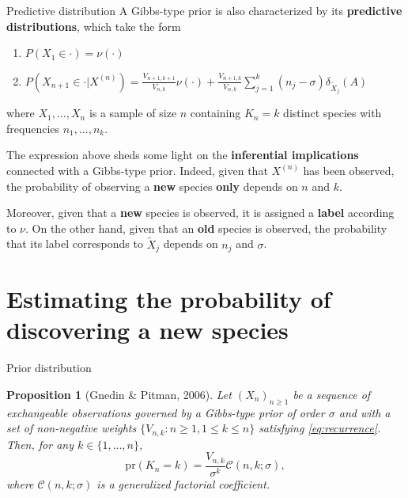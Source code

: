 \documentclass[11pt]{beamer}
\newtheorem{proposition}{Proposition}
\begin{document}
\begin{frame}{Predictive distribution}
    A Gibbs-type prior is also characterized by its \textbf{predictive distributions}, which take the form
    \begin{enumerate}
        \item \(P(X_1 \in \cdot) = \nu(\cdot)\)
        \item \(P(X_{n + 1} \in \cdot | X^{(n)}) = \frac{V_{n+1,k+1}}{V_{n,k}} \nu(\cdot) + \frac{V_{n+1,k}}{V_{n, k}} \sum_{j = 1}^k (n_j - \sigma) \delta_{\tilde{X}_j}(A)\)
    \end{enumerate}
    where \(X_1,...,X_n\) is a sample of size \(n\) containing \(K_n = k\) distinct species with frequencies \(n_1,...,n_k\).
    \medskip\pause

    The expression above sheds some light on the \textbf{inferential implications} connected with a Gibbs-type prior. Indeed, given that \(X^{(n)}\) has been observed, the probability of observing a \textbf{new} species \textbf{only} depends on \(n\) and \(k\). 
    \medskip
    
    Moreover, given that a \textbf{new} species is observed, it is assigned a \textbf{label} according to \(\nu\). On the other hand, given that an \textbf{old} species is observed, the probability that its label corresponds to \(\tilde{X}_j\) depends on \(n_j\) and \(\sigma\).
\end{frame}

\section{Estimating the probability of discovering a new species}

\begin{frame}{Prior distribution}
    \begin{proposition}[Gnedin \& Pitman, 2006]
         Let \((X_n)_{n \geq 1}\) be a sequence of exchangeable observations governed by a Gibbs-type prior of order \(\sigma\) and with a set of non-negative weights \(\{V_{n, k} \colon n \geq 1, 1 \leq k \leq n\}\) satisfying \eqref{eq:recurrence}. Then, for any \(k \in \{1,...,n\}\),
        \begin{equation*}
            \text{pr}(K_n = k) = \frac{V_{n,k}}{\sigma^k} \mathscr{C}(n, k; \sigma),
        \end{equation*}
        where \(\mathscr{C}(n, k; \sigma)\) is a generalized factorial coefficient. %
    \end{proposition}
\end{frame}
\end{document}
